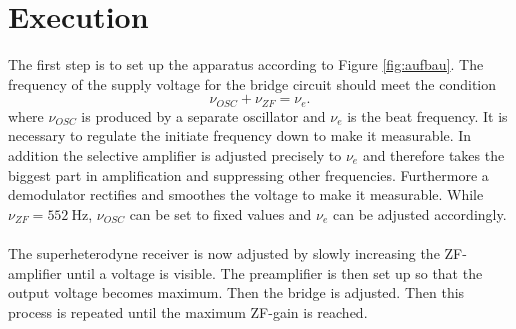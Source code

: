 \section{Execution}
The first step is to set up the apparatus according to Figure \ref{fig:aufbau}.
The frequency of the supply voltage for the bridge circuit should meet the condition
\begin{equation}
  \nu_{OSC}+\nu_{ZF}=\nu_e.
\end{equation}
where $\nu_{OSC}$ is produced by a separate oscillator and $\nu_e$ is the beat frequency. It is necessary to regulate the
initiate frequency down to make it measurable. In addition the selective amplifier is adjusted precisely to $\nu_e$ and therefore takes
the biggest part in amplification and suppressing other frequencies. Furthermore a demodulator rectifies and smoothes the voltage to make it measurable.
While $\nu_{ZF}=\SI{552}{\hertz}$, $\nu_{OSC}$ can be set to fixed values and $\nu_e$ can be adjusted accordingly. \\ \\ \noindent
The superheterodyne receiver is now adjusted by slowly increasing the ZF-amplifier until a voltage is visible.
The preamplifier is then set up so that the output voltage becomes maximum.
Then the bridge is adjusted. Then this process is repeated until the maximum ZF-gain is reached.
